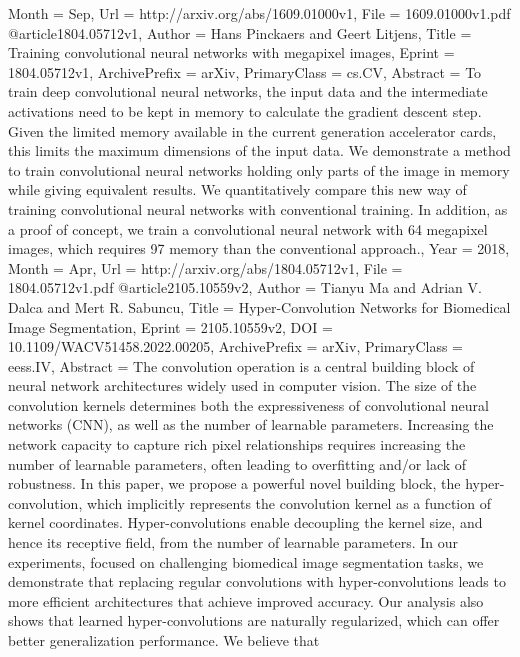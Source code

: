 {{{{Month         = {Sep},
Url           = {http://arxiv.org/abs/1609.01000v1},
File          = {1609.01000v1.pdf}
}
@article{1804.05712v1,
Author        = {Hans Pinckaers and Geert Litjens},
Title         = {Training convolutional neural networks with megapixel images},
Eprint        = {1804.05712v1},
ArchivePrefix = {arXiv},
PrimaryClass  = {cs.CV},
Abstract      = {To train deep convolutional neural networks, the input data and the
intermediate activations need to be kept in memory to calculate the gradient
descent step. Given the limited memory available in the current generation
accelerator cards, this limits the maximum dimensions of the input data. We
demonstrate a method to train convolutional neural networks holding only parts
of the image in memory while giving equivalent results. We quantitatively
compare this new way of training convolutional neural networks with
conventional training. In addition, as a proof of concept, we train a
convolutional neural network with 64 megapixel images, which requires 97%
memory than the conventional approach.},
Year          = {2018},
Month         = {Apr},
Url           = {http://arxiv.org/abs/1804.05712v1},
File          = {1804.05712v1.pdf}
}
@article{2105.10559v2,
Author        = {Tianyu Ma and Adrian V. Dalca and Mert R. Sabuncu},
Title         = {Hyper-Convolution Networks for Biomedical Image Segmentation},
Eprint        = {2105.10559v2},
DOI           = {10.1109/WACV51458.2022.00205},
ArchivePrefix = {arXiv},
PrimaryClass  = {eess.IV},
Abstract      = {The convolution operation is a central building block of neural network
architectures widely used in computer vision. The size of the convolution
kernels determines both the expressiveness of convolutional neural networks
(CNN), as well as the number of learnable parameters. Increasing the network
capacity to capture rich pixel relationships requires increasing the number of
learnable parameters, often leading to overfitting and/or lack of robustness.
In this paper, we propose a powerful novel building block, the
hyper-convolution, which implicitly represents the convolution kernel as a
function of kernel coordinates. Hyper-convolutions enable decoupling the kernel
size, and hence its receptive field, from the number of learnable parameters.
In our experiments, focused on challenging biomedical image segmentation tasks,
we demonstrate that replacing regular convolutions with hyper-convolutions
leads to more efficient architectures that achieve improved accuracy. Our
analysis also shows that learned hyper-convolutions are naturally regularized,
which can offer better generalization performance. We believe that
}}}}}

